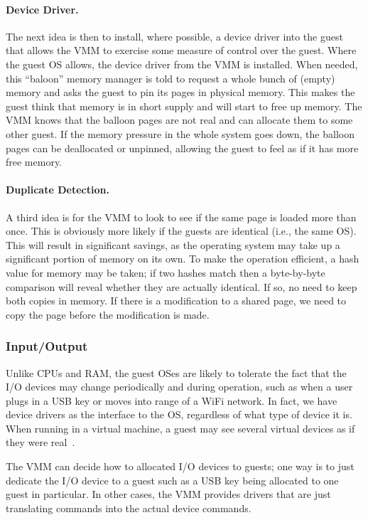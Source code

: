 \paragraph{Device Driver.} The next idea is then to install, where possible, a device driver into the guest that allows the VMM to exercise some measure of control over the guest. Where the guest OS allows, the device driver from the VMM is installed. When needed, this ``baloon'' memory manager is told to request a whole bunch of (empty) memory and asks the guest to pin its pages in physical memory. This makes the guest think that memory is in short supply and will start to free up memory. The VMM knows that the balloon pages are not real and can allocate them to some other guest. If the memory pressure in the whole system goes down, the balloon pages can be deallocated or unpinned, allowing the guest to feel as if it has more free memory.

\paragraph{Duplicate Detection.} A third idea is for the VMM to look to see if the same page is loaded more than once. This is obviously more likely if the guests are identical (i.e., the same OS). This will result in significant savings, as the operating system may take up a significant portion of memory on its own. To make the operation efficient, a hash value for memory may be taken; if two hashes match then a byte-by-byte comparison will reveal whether they are actually identical. If so, no need to keep both copies in memory. If there is a modification to a shared page, we need to copy the page before the modification is made.

\subsubsection*{Input/Output}
Unlike CPUs and RAM, the guest OSes are likely to tolerate the fact that the I/O devices may change periodically and during operation, such as when a user plugs in a USB key or moves into range of a WiFi network. In fact, we have device drivers as the interface to the OS, regardless of what type of device it is. When running in a virtual machine, a guest may see several virtual devices as if they were real~\cite{osc}.

The VMM can decide how to allocated I/O devices to guests; one way is to just dedicate the I/O device to a guest such as a USB key being allocated to one guest in particular. In other cases, the VMM provides drivers that are just translating commands into the actual device commands. 

